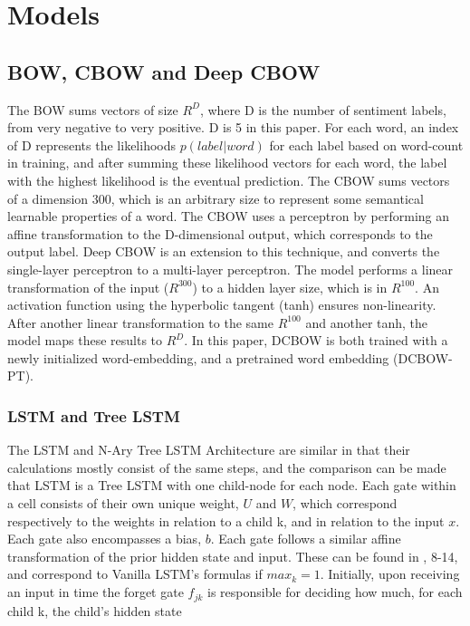 \section{Models}
\label{sec: models}
\subsection{BOW, CBOW and Deep CBOW}
The BOW sums vectors of size $R^{D}$, where D is the number of sentiment labels,
from very negative to very positive. D is 5 in this paper. For each word, an
index of D represents the likelihoods $p(label|word)$ for each label based on
word-count in training, and after summing these likelihood vectors for each
word, the label with the highest likelihood is the eventual prediction. The CBOW
sums vectors of a dimension 300, which is an arbitrary size to represent some
semantical learnable properties of a word. The CBOW uses a perceptron by
performing an affine transformation to the D-dimensional output, which
corresponds to the output label. Deep CBOW is an extension to this technique,
and converts the single-layer perceptron to a multi-layer perceptron. The model
performs a linear transformation of the input ($R^{300}$) to a hidden layer
size, which is in $R^{100}$. An activation function using the hyperbolic tangent
(tanh) ensures non-linearity. After another linear transformation to the same
$R^{100}$ and another tanh, the model maps these results to $R^D$. In this
paper, DCBOW is both trained with a newly initialized word-embedding, and a
pretrained word embedding (DCBOW-PT).
\subsubsection{LSTM and Tree LSTM}
The LSTM and N-Ary Tree LSTM Architecture are similar in that their calculations
mostly consist of the same steps, and the comparison can be made that LSTM is a
Tree LSTM with one child-node for each node. Each gate within a cell consists of
their own unique weight, $U$ and $W$, which correspond respectively to the
weights in relation to a child k, and in relation to the input $x$. Each gate
also encompasses a bias, $b$. Each gate follows a similar affine transformation
of the prior hidden state and input. These can be found in
\cite{tai2015improved}, 8-14, and correspond to Vanilla LSTM's formulas if
$max_k=1$. Initially, upon receiving an input in time the forget gate $f_{jk}$
is responsible for deciding how much, for each child k, the child's hidden state


